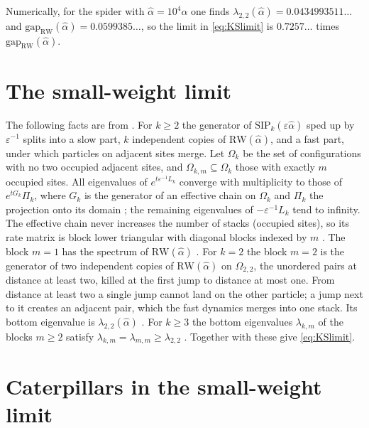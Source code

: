 \documentclass[11pt]{article}
\theoremstyle{remark}
\newcommand{\gap}{\mathrm{gap}}
\newcommand{\RW}{\mathrm{RW}}
\newcommand{\eps}{\varepsilon}
\begin{document}
Numerically, for the spider with $\hat\alpha=10^4\alpha$ one finds $\lambda_{2,2}(\hat\alpha)=0.0434993511\dots$ and $\gap_{\RW}(\hat\alpha)=0.0599385\dots$, so the limit in \eqref{eq:KSlimit} is $0.7257\dots$ times $\gap_{\RW}(\hat\alpha)$.

\section{The small-weight limit}\label{sec:limit}

The following facts are from \cite[Section~5]{KS25}. For $k\ge2$ the generator of $\mathrm{SIP}_k(\eps\hat\alpha)$ sped up by $\eps^{-1}$ splits into a slow part, $k$ independent copies of $\RW(\hat\alpha)$, and a fast part, under which particles on adjacent sites merge. Let $\Omega_k$ be the set of configurations with no two occupied adjacent sites, and $\Omega_{k,m}\subseteq\Omega_k$ those with exactly $m$ occupied sites. All eigenvalues of $e^{t\eps^{-1}L_k}$ converge with multiplicity to those of $e^{tG_k}\Pi_k$, where $G_k$ is the generator of an effective chain on $\Omega_k$ and $\Pi_k$ the projection onto its domain \cite[Proposition~5.1 and the paragraph after it]{KS25}; the remaining eigenvalues of $-\eps^{-1}L_k$ tend to infinity. The effective chain never increases the number of stacks (occupied sites), so its rate matrix is block lower triangular with diagonal blocks indexed by $m$ \cite[Proposition~5.4]{KS25}. The block $m=1$ has the spectrum of $\RW(\hat\alpha)$ \cite[Proposition~5.4(b)]{KS25}. For $k=2$ the block $m=2$ is the generator of two independent copies of $\RW(\hat\alpha)$ on $\Omega_{2,2}$, the unordered pairs at distance at least two, killed at the first jump to distance at most one. From distance at least two a single jump cannot land on the other particle; a jump next to it creates an adjacent pair, which the fast dynamics merges into one stack. Its bottom eigenvalue is $\lambda_{2,2}(\hat\alpha)$ \cite[Corollary~5.7]{KS25}. For $k\ge3$ the bottom eigenvalues $\lambda_{k,m}$ of the blocks $m\ge2$ satisfy $\lambda_{k,m}=\lambda_{m,m}\ge\lambda_{2,2}$ \cite[Propositions~5.10 and~5.14]{KS25}. Together with \cite[Corollaries~5.2 and~5.7]{KS25} these give \eqref{eq:KSlimit}.

\section{Caterpillars in the small-weight limit}\label{sec:B}
\end{document}
